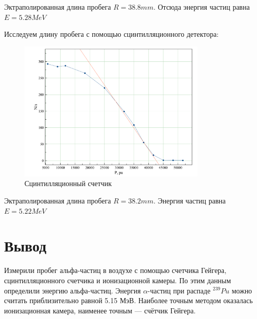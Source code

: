 \documentclass[a4paper,12pt]{article}
\begin{document}
    Эктраполированная длина пробега $R = 38.8 mm$. Отсюда энергия частиц равна $E = 5.28 MeV$
    
    Исследуем длину пробега с помощью сцинтилляционного детектора:
    \begin{figure}[h!]
        \centering
        \includegraphics[width=0.8\textwidth]{truba}
        \caption{Сцинтилляционный счетчик}
    \end{figure}
    
    Эктраполированная длина пробега $R = 38.2 mm$. Энергия частиц равна $E = 5.22 MeV$
    


\pagebreak
    
	\section{Вывод}
    Измерили пробег альфа-частиц в воздухе с помощью счетчика Гейгера, сцинтилляционного счетчика и ионизационной камеры. По этим данным определили энергию альфа-частиц. Энергия $\alpha$-частиц при распаде $^{239}Pu$ можно считать приблизительно равной  5.15 МэВ. Наиболее точным методом оказалась ионизационная камера, наименее точным --- счётчик Гейгера.
\end{document}
